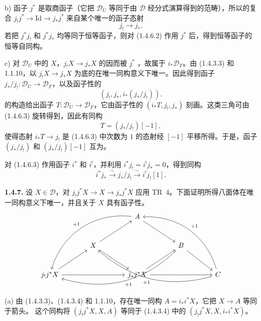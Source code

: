 b) 函子 $j^*$ 是取商函子（它把 $\mathcal D_U$ 等同于由 $\mathcal D$ 经分式演算得到的范畴），所以的复合 $j_!j^*\to\mathrm{Id}\to j_*j^*$ 来自某个唯一的函子态射
\begin{equation*}
j_!\longrightarrow j_*.\tag{1.4.6.2}
\end{equation*}
若把 $j^*j_!$ 和 $j^*j_*$ 均等同于恒等函子，则对 (1.4.6.2) 作用 $j^*$ 后，得到恒等函子的恒等自同构。

c) 对 $\mathcal D_U$ 中的 $X$，$j_!X\to j_*X$ 的因而被 $j^*$ ，故属于 $i_*\mathcal D_F$。由 (1.4.3.3) 和 1.1.10，以 $j_!X\to j_*X$ 为底的在唯一同构意义下唯一。因此得到函子 $j_*/j_!:\mathcal D_U\to\mathcal D_F$，以及函子性的
\begin{equation*}
(j_!,j_*,i_*(j_*/j_!)).\tag{1.4.6.3}
\end{equation*}
的构造给出函子 $T:\mathcal D_U\to\mathcal D_F$，它由函子性的 $(i_*T,j_!,j_*)$ 刻画。这类三角可由 (1.4.6.3) 旋转得到，因此有同构
\[
T=(j_*/j_!)[-1],
\]
使得态射 $i_*T\to j_!$ 是 (1.4.6.3) 中次数为 $1$ 的态射经 $[-1]$ 平移所得。于是，函子 $(j_*/j_!)$ 和 $(j_*/j_!)[-1]$ 互为。

对 (1.4.6.3) 作用函子 $i^*$ 和 $i^!$，并利用 $i^*j_!=i^!j_*=0$，得到同构
\begin{equation*}
i^*j_*\xrightarrow{\sim}j_*/j_!\xrightarrow{\sim}i^!j_![1].\tag{1.4.6.4}
\end{equation*}

\par\medskip\noindent\textbf{1.4.7.}
设 $X\in\mathcal D$，对 $j_!j^*X\to X\to j_*j^*X$ 应用 TR~4。下面证明所得八面体在唯一同构意义下唯一，并且关于 $X$ 具有函子性。
\[
\begin{tikzcd}[ampersand replacement=\&,column sep=large,row sep=large]
\&\&A\arrow[dr]\arrow[ddll,bend right=40,"{+1}"']\&\&\\
\&X\arrow[ur]\arrow[dr]\&\&B\arrow[dr]\arrow[dlll,bend left=30,"{+1}"]\&\\
j_!j^*X\arrow[ur]\arrow[rr]\&\&j_*j^*X\arrow[ur]\arrow[rr]\&\&C\arrow[ulll,bend left=28,"{+1}"]\arrow[uull,bend right=38,"{+1}"']
\end{tikzcd}
\]
(a) 由 (1.4.3.3)、(1.4.3.4) 和 1.1.10，存在唯一同构 $A=i_*i^*X$，它把 $X\to A$ 等同于箭头。
这个同构将 $(j_!j^*X,X,A)$ 等同于 (1.4.3.4) 中的 $(j_!j^*X,X,i_*i^*X)$。

